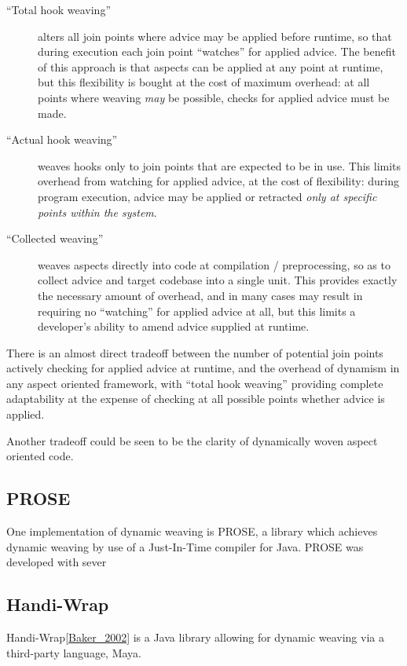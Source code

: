 \begin{description}
    \item[``Total hook weaving''] alters all join points where advice may be
    applied before runtime, so that during execution each join point ``watches''
    for applied advice. The benefit of this approach is that aspects can be
    applied at any point at runtime, but this flexibility is bought at the cost
    of maximum overhead: at all points where weaving \emph{may} be possible,
    checks for applied advice must be made.
    \item[``Actual hook weaving''] weaves hooks only to join points that are
    expected to be in use. This limits overhead from watching for applied
    advice, at the cost of flexibility: during program execution, advice may be
    applied or retracted \emph{only at specific points within the system}.
    \item[``Collected weaving''] weaves aspects directly into code at
    compilation / preprocessing, so as
    to collect advice and target codebase into a single unit. This provides
    exactly the necessary amount of overhead, and in many cases may result in
    requiring no ``watching'' for applied advice at all, but this limits a
    developer's ability to amend advice supplied at runtime.
\end{description}

There is an almost direct tradeoff between the number of potential join points
actively checking for applied advice at runtime, and the overhead of dynamism in
any aspect oriented framework, with ``total hook weaving'' providing complete
adaptability at the expense of checking at all possible points whether advice is
applied.

Another tradeoff could be seen to be the clarity of dynamically woven aspect
oriented code. 


\subsection{PROSE}
One implementation of dynamic weaving is PROSE, a library which achieves dynamic weaving by
use of a Just-In-Time compiler for Java. PROSE was developed with sever


\subsection{Handi-Wrap}
Handi-Wrap\cref{Baker_2002} is a Java library allowing for dynamic weaving via
a third-party language, Maya. 



